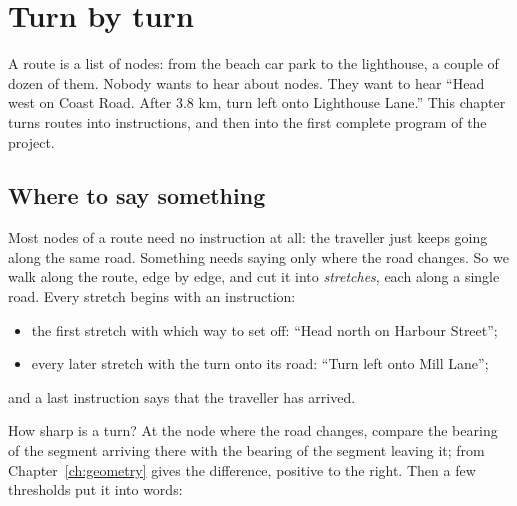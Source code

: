 \chapter{Turn by turn}\label{ch:directions}

A route is a list of nodes: from the beach car park to the lighthouse, a
couple of dozen of them. Nobody wants to hear about nodes. They want to
hear ``Head west on Coast Road. After 3.8 km, turn left onto Lighthouse
Lane.'' This chapter turns routes into instructions, and then into the
first complete program of the project.

\section{Where to say something}

Most nodes of a route need no instruction at all: the traveller just keeps
going along the same road. Something needs saying only where the road
changes. So we walk along the route, edge by edge, and cut it into
\emph{stretches}, each along a single road. Every stretch begins with an
instruction:

\begin{itemize}[nosep]
  \item the first stretch with which way to set off: ``Head north on
    Harbour Street'';
  \item every later stretch with the turn onto its road: ``Turn left onto
    Mill Lane'';
\end{itemize}
and a last instruction says that the traveller has arrived.

How sharp is a turn? At the node where the road changes, compare the
bearing of the segment arriving there with the bearing of the segment
leaving it;  from Chapter~\ref{ch:geometry} gives the
difference, positive to the right. Then a few thresholds put it into words:

\begin{center}
\end{center}

